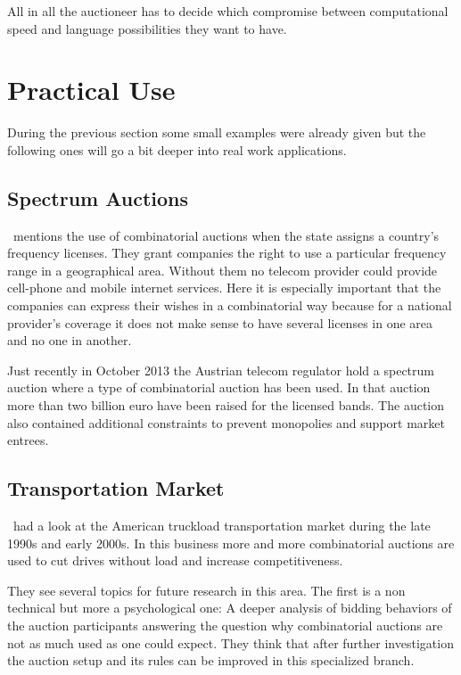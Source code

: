 \documentclass[a4paper]{paper}
\begin{document}
All in all the auctioneer has to decide which compromise between computational speed and language possibilities they want to have.

\section{Practical Use}

During the previous section some small examples were already given but the following ones will go a bit deeper into real work applications.

\subsection{Spectrum Auctions}
\cite[p.~269]{BN07}~mentions the use of combinatorial auctions when the state assigns a country's frequency licenses. They grant companies the right to use a particular frequency range in a geographical area. Without them no telecom provider could provide cell-phone and mobile internet services. Here it is especially important that the companies can express their wishes in a combinatorial way because for a national provider's coverage it does not make sense to have several licenses in one area and no one in another.

Just recently in October 2013 the Austrian telecom regulator hold a spectrum auction where a type of combinatorial auction has been used. In that auction more than two billion euro have been raised for the licensed bands. The auction also contained additional constraints to prevent monopolies and support market entrees.~\cite{RTR:Telecom}

\subsection{Transportation Market}
\cite{CELM07}~had a look at the American truckload transportation market during the late 1990s and early 2000s. In this business more and more combinatorial auctions are used to cut drives without load and increase competitiveness.

They see several topics for future research in this area. The first is a non technical but more a psychological one: A deeper analysis of bidding behaviors of the auction participants answering the question why combinatorial auctions are not as much used as one could expect. They think that after further investigation the auction setup and its rules can be improved in this specialized branch.
\end{document}
